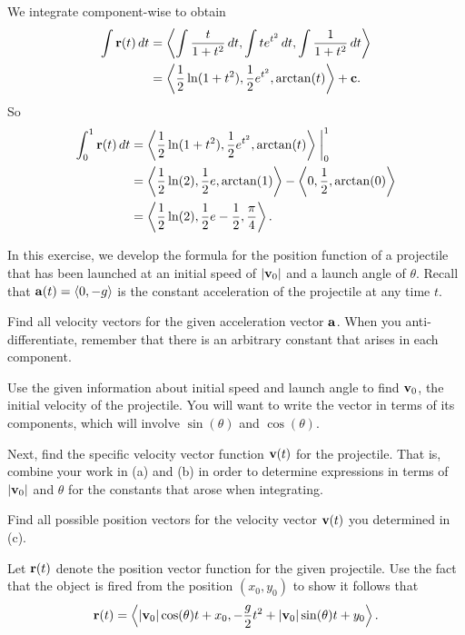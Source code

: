 \begin{exercises}
\begin{exerciseSolution}
	\item We integrate component-wise to obtain
\begin{align*}
\int \mathbf{r}(t) \, dt &= \left\langle \int \frac{t}{1+t^2} \, dt, \int te^{t^2} \, dt, \int \frac{1}{1+t^2} \, dt \right\rangle \\
	&= \left\langle \frac{1}{2}\ln(1+t^2), \frac{1}{2} e^{t^2}, \arctan(t) \right\rangle + \mathbf{c}.
\end{align*} 
So
\begin{align*}
\int_0^1 \mathbf{r}(t) \, dt &= \left\langle \frac{1}{2}\ln(1+t^2), \frac{1}{2} e^{t^2}, \arctan(t) \right\rangle \biggm|_0^1 \\
	&= \left\langle \frac{1}{2}\ln(2), \frac{1}{2} e, \arctan(1) \right\rangle - \left\langle 0, \frac{1}{2}, \arctan(0) \right\rangle \\
	&= \left\langle \frac{1}{2}\ln(2), \frac{1}{2} e - \frac{1}{2}, \frac{\pi}{4} \right\rangle.
\end{align*}

	\ea
\end{exerciseSolution}

\item \label{Ez:9.7.5} In this exercise, we develop the formula for the position function of a projectile that has been launched at an initial speed of $|\mathbf{v}_0|$ and a launch angle of $\theta.$  Recall that  $\mathbf{a}(t) = \langle 0, -g \rangle$ is the constant acceleration of the projectile at any time $t$.
\ba
    \item Find all velocity vectors for the given acceleration vector $\mathbf{a}$.  When you anti-differentiate, remember that there is an arbitrary constant that arises in each component.

   \item Use the given information about initial speed and launch angle to find $\mathbf{v}_0$, the initial velocity of the projectile.  You will want to write the vector in terms of its components, which will involve $\sin(\theta)$ and $\cos(\theta)$.

    \item Next, find the specific velocity vector function $\mathbf{v}(t)$ for the projectile. That is, combine your work in (a) and (b) in order to determine expressions in terms of $|\mathbf{v}_0|$ and $\theta$ for the constants that arose when integrating.

 \item Find all possible position vectors for the velocity vector $\mathbf{v}(t)$ you determined in (c).

    \item Let $\mathbf{r}(t)$ denote the position vector function for the given projectile. Use the fact that the object is fired from the position $(x_0, y_0)$ to show it follows that
\[\mathbf{r}(t) = \left\langle |\mathbf{v}_0| \cos(\theta)t + x_0, -\frac{g}{2}t^2 + |\mathbf{v}_0| \sin(\theta)t + y_0 \right\rangle.\]


\end{exercises}
